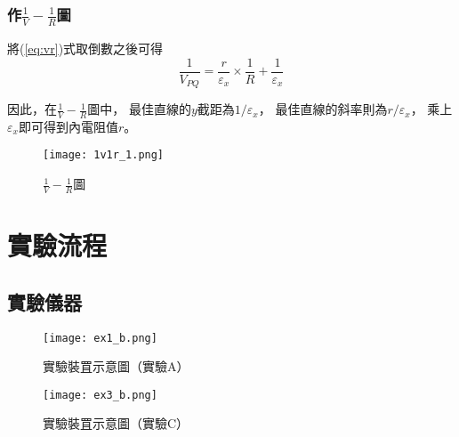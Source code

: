 \documentclass[12pt]{article}
\begin{document}
            \subsubsection{作$\frac{1}{V}-\frac{1}{R}$圖}
                
            將(\ref{eq:vr})式取倒數之後可得
            \begin{equation}
                \label{eq:1v1r}
            \frac{1}{V_{PQ}}=\frac{r}{\varepsilon_x}\times \frac{1}{R}+\frac{1}{\varepsilon_x}
            \end{equation}

            因此，在$\frac{1}{V}-\frac{1}{R}$圖中，
            最佳直線的$y$截距為$1/\varepsilon_x$，
            最佳直線的斜率則為$r/\varepsilon_x$，
            乘上$\varepsilon_x$即可得到內電阻值$r$。

            \begin{figure}[h]
                \centering
                \texttt{[image: 1v1r\_1.png]}
                \caption{$\frac{1}{V}-\frac{1}{R}$圖}
                \label{fig:1v1r_ex}
            \end{figure}
                
                
               
    \section{實驗流程}
        
        \subsection{實驗儀器}

            \quad

            \begin{figure}[h]
                
                \begin{minipage}{0.49\textwidth}
                \centering
                \texttt{[image: ex1\_b.png]}
                \caption{實驗裝罝示意圖（實驗A）}
                \label{fig:ex1}
                \end{minipage}
                \begin{minipage}{0.49\textwidth}
                \centering
                \texttt{[image: ex3\_b.png]}
                \caption{實驗裝罝示意圖（實驗C）}
                \label{fig:ex3}
                \end{minipage}
                
            \end{figure}
            
\end{document}
